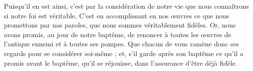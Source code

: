 Puisqu’il en est ainsi, c’est par la considération de notre vie que nous connaîtrons si notre foi est véritable. C’est en accomplissant en nos œuvres ce que nous promettons par nos paroles, que nous sommes véritablement fidèles. Or, nous avons promis, au jour de notre baptême, de renoncer à toutes les œuvres de l’antique ennemi et à toutes ses pompes. Que chacun de vous ramène donc ses regards pour se considérer soi-même ; et, s’il garde après son baptême ce qu’il a promis avant le baptême, qu’il se réjouisse, dans l’assurance d’être déjà fidèle.